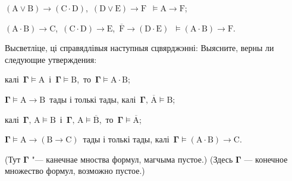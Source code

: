 \begin{problemList}
{\begin{belarusianEnumerate}
\item $(\boldsymbol{\mathrm{A}} \vee \boldsymbol{\mathrm{B}}) \to (\boldsymbol{\mathrm{C}} \cdot
\boldsymbol{\mathrm{D}})$,\, $(\boldsymbol{\mathrm{D}} \vee \boldsymbol{\mathrm{E}}) \to
\boldsymbol{\mathrm{F}}$\, $\vDash \boldsymbol{\mathrm{A}} \to \boldsymbol{\mathrm{F}}$;

\item $(\boldsymbol{\mathrm{A}} \cdot \boldsymbol{\mathrm{B}}) \to \boldsymbol{\mathrm{C}}$,\,
$(\boldsymbol{\mathrm{C}} \cdot \boldsymbol{\mathrm{D}}) \to \boldsymbol{\mathrm{E}}$,\,
$\overline{\boldsymbol{\mathrm{F}}} \to (\boldsymbol{\mathrm{D}} \cdot \boldsymbol{\mathrm{E}})$\,
$\vDash (\boldsymbol{\mathrm{A}} \cdot \boldsymbol{\mathrm{B}}) \to \boldsymbol{\mathrm{F}}$.

\end{belarusianEnumerate}
}

\smallskip

\problemItemWithCommonPartComplicated
{Высветліце, ці справядлівыя наступныя сцвярджэнні:}
{Выясните, верны ли следующие утверждения:}
{%
\begin{belarusianEnumerate}

\item калі\, $\boldsymbol{\Gamma} \vDash \boldsymbol{\mathrm{A}}$\, і\, $\boldsymbol{\Gamma}
\vDash \boldsymbol{\mathrm{B}}$,\, то\, $\boldsymbol{\Gamma} \vDash \boldsymbol{\mathrm{A}} \cdot
\boldsymbol{\mathrm{B}}$;

\item $\boldsymbol{\Gamma} \vDash \boldsymbol{\mathrm{A}} \to \boldsymbol{\mathrm{B}}$\, тады
і толькі тады, калі\, $\boldsymbol{\Gamma},\, \overline{\boldsymbol{\mathrm{A}}} \vDash \boldsymbol{\mathrm{B}}$;

\item калі\, $\boldsymbol{\Gamma},\, \boldsymbol{\mathrm{A}} \vDash \boldsymbol{\mathrm{B}}$\, і\,
$\boldsymbol{\Gamma},\, \boldsymbol{\mathrm{A}} \vDash \overline{\boldsymbol{\mathrm{B}}}$,\, то\,
$\boldsymbol{\Gamma} \vDash \overline{\boldsymbol{\mathrm{A}}}$;

\item $\boldsymbol{\Gamma} \vDash \boldsymbol{\mathrm{A}} \to (\boldsymbol{\mathrm{B}}
\to \boldsymbol{\mathrm{C}})$\, тады і толькі тады, калі\, $\boldsymbol{\Gamma} \vDash (\boldsymbol{\mathrm{A}} \cdot \boldsymbol{\mathrm{B}}) \to \boldsymbol{\mathrm{C}}$.

\end{belarusianEnumerate}
}
{(Тут $\boldsymbol{\Gamma}$ "--- канечнае мноства формул, магчыма пустое.)}
{(Здесь $\boldsymbol{\Gamma}$ --- конечное множество формул, возможно пустое.)}

\end{problemList}


